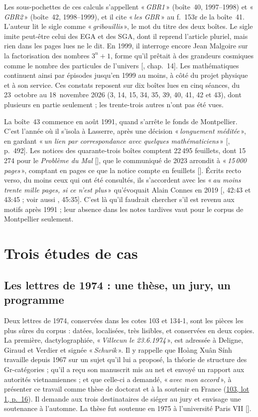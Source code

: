 \documentclass[11pt]{amsart}
\makeatletter
\newcommand{\ts}[1]{\foreignlanguage{english}{#1}}
\newcommand{\q}[1]{«\,\textit{#1}\,»}
\def\RHM@first#1--#2\@nil{#1}
\DeclareRobustCommand{\lot}[3]{\begingroup\edef\RHM@pdfpage{\the\numexpr\RHM@first#3--\@nil+1\relax}\href{https://grothendieck.umontpellier.fr/#1.pdf\#page=\RHM@pdfpage}{#1, lot #2, p.~#3}\endgroup}
\newcommand{\lot}[3]{\href{https://grothendieck.commutator.io/\##1/#2/p#3}{#1, lot #2, p.~#3}}
\makeatother
\begin{document}
Les sous-pochettes de ces calculs s'appellent \q{GBR1} (boîte~40, 1997--1998) et \q{GBR2} (boîte~42, 1998--1999), et il cite \q{les GBR} au f.~153r de la boîte~41. L'auteur lit le sigle comme \q{gribouillis}, le mot du titre des deux boîtes. Le sigle imite peut-être celui des EGA et des SGA, dont il reprend l'article pluriel, mais rien dans les pages lues ne le dit. En 1999, il interroge encore Jean Malgoire sur la factorisation des nombres $3^n + 1$, forme qu'il prêtait à des grandeurs cosmiques comme le nombre des particules de l'univers [\citealp{circle-spirit}, chap.~14]. Les mathématiques continuent ainsi par épisodes jusqu'en 1999 au moins, à côté du projet physique et à son service. Ces constats reposent sur dix boîtes lues en cinq séances, du 23~octobre au 18~novembre 2026 (3, 14, 15, 34, 35, 39, 40, 41, 42 et 43), dont plusieurs en partie seulement ; les trente-trois autres n'ont pas été vues.

La boîte~43 commence en août 1991, quand s'arrête le fonds de Montpellier. C'est l'année où il s'isola à Lasserre, après une décision \q{longuement méditée}, en gardant \q{un lien par correspondance avec quelques mathématiciens} [\citealp{grothendieck2025}, p.~492]. Les notices des quarante-trois boîtes comptent 22\,495 feuillets, dont 15\,274 pour le \emph{Problème du Mal} [\citealp{bnf-naf29093}], que le communiqué de 2023 arrondit à \q{15\,000 pages}, comptant en pages ce que la notice compte en feuillets [\citealp{bnf2023cp}]. Écrits recto verso, du moins ceux qui ont été consultés, ils s'accordent avec les \q{au moins trente mille pages, si ce n'est plus} qu'évoquait Alain Connes en 2019 [\citealp{serreconnes2019}, \ts{42:43} et \ts{43:45} ; voir aussi \citealp{schneps2026}, \ts{45:35}]. C'est là qu'il faudrait chercher s'il est revenu aux motifs après 1991 ; leur absence dans les notes tardives vaut pour le corpus de Montpellier seulement.

\section{Trois études de cas}\label{sec:cas}

\subsection{Les lettres de 1974 : une thèse, un jury, un programme}\label{sub:sinh}

Deux lettres de 1974, conservées dans les cotes 103 et 134-1, sont les pièces les plus sûres du corpus : datées, localisées, très lisibles, et conservées en deux copies. La première, dactylographiée, \q{Villecun le 23.6.1974}, est adressée à Deligne, Giraud et Verdier et signée \q{Schurik}. Il y rappelle que Hoàng Xuân Sính travaille depuis 1967 sur un sujet qu'il lui a proposé, la théorie de structure des Gr-catégories ; qu'il a reçu son manuscrit mis au net et envoyé un rapport aux autorités vietnamiennes ; et que celle-ci a demandé, \q{avec mon accord}, à présenter ce travail comme thèse de doctorat et à la soutenir en France (\lot{103}{1}{16}). Il demande aux trois destinataires de siéger au jury et envisage une soutenance à l'automne. La thèse fut soutenue en 1975 à l'université Paris VII [\citealp{sinh1975}].
\end{document}
